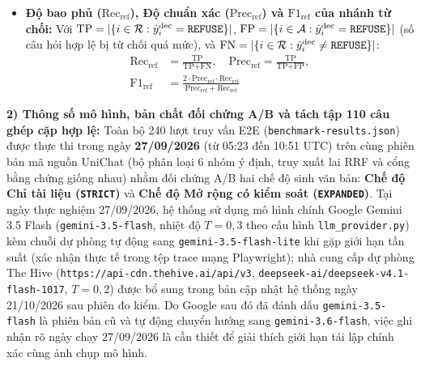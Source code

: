 \documentclass{IEEEtran}
\begin{document}
\begin{itemize}
\begin{equation}
    \end{equation}
    \item \textbf{Độ bao phủ ($\text{Rec}_{\text{ref}}$), Độ chuẩn xác ($\text{Prec}_{\text{ref}}$) và $\text{F1}_{\text{ref}}$ của nhánh từ chối:} Với $\text{TP} = |\{i \in \mathcal{R} : \hat{y}_i^{\text{dec}} = \text{\texttt{REFUSE}}\}|$, $\text{FP} = |\{i \in \mathcal{A} : \hat{y}_i^{\text{dec}} = \text{\texttt{REFUSE}}\}|$ (số câu hỏi hợp lệ bị từ chối quá mức), và $\text{FN} = |\{i \in \mathcal{R} : \hat{y}_i^{\text{dec}} \ne \text{\texttt{REFUSE}}\}|$:
    \begin{equation}
    \begin{aligned}
    \text{Rec}_{\text{ref}} &= \frac{\text{TP}}{\text{TP} + \text{FN}}, \quad \text{Prec}_{\text{ref}} = \frac{\text{TP}}{\text{TP} + \text{FP}}, \\[3pt]
    \text{F1}_{\text{ref}} &= \frac{2 \cdot \text{Prec}_{\text{ref}} \cdot \text{Rec}_{\text{ref}}}{\text{Prec}_{\text{ref}} + \text{Rec}_{\text{ref}}}
    \end{aligned}
    \end{equation}
\end{itemize}

\textbf{2) Thông số mô hình, bản chất đối chứng A/B và tách tập 110 câu ghép cặp hợp lệ:}
Toàn bộ 240 lượt truy vấn E2E (\texttt{benchmark-results.json}) được thực thi trong ngày \textbf{27/09/2026} (từ 05:23 đến 10:51 UTC) trên cùng phiên bản mã nguồn UniChat (bộ phân loại 6 nhóm ý định, truy xuất lai RRF và cổng bằng chứng giống nhau) nhằm đối chứng A/B hai chế độ sinh văn bản: \textbf{Chế độ Chỉ tài liệu (\texttt{STRICT})} và \textbf{Chế độ Mở rộng có kiểm soát (\texttt{EXPANDED})}. Tại ngày thực nghiệm 27/09/2026, hệ thống sử dụng mô hình chính Google Gemini 3.5 Flash (\texttt{gemini-3.5-flash}, nhiệt độ $T = 0{,}3$ theo cấu hình \texttt{llm\_provider.py}) kèm chuỗi dự phòng tự động sang \texttt{gemini-3.5-flash-lite} khi gặp giới hạn tần suất (xác nhận thực tế trong tệp trace mạng Playwright); nhà cung cấp dự phòng The Hive (\texttt{https://api-cdn.thehive.ai/api/v3}, \texttt{deepseek-ai/deepseek-v4.1-flash-1017}, $T = 0{,}2$) được bổ sung trong bản cập nhật hệ thống ngày 21/10/2026 sau phiên đo kiểm. Do Google sau đó đã đánh dấu \texttt{gemini-3.5-flash} là phiên bản cũ và tự động chuyển hướng sang \texttt{gemini-3.6-flash}, việc ghi nhận rõ ngày chạy 27/09/2026 là cần thiết để giải thích giới hạn tái lập chính xác cùng ảnh chụp mô hình.
\end{document}
